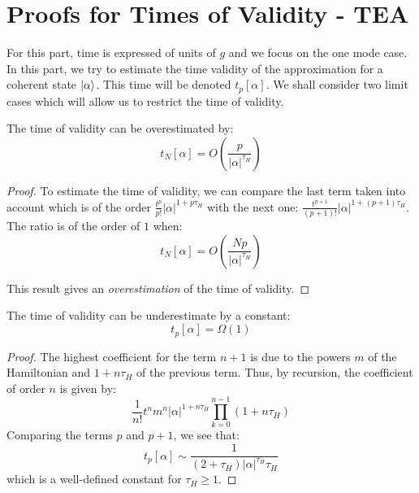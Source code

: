 \section{Proofs for Times of Validity - TEA} \label{proofs-time-val}
For this part, time is expressed of units of $g$ and we focus on the one mode case. In this part, we try to estimate the time validity of the approximation for a coherent state $\ket{\alpha}$. This time will be denoted $t_p[\alpha]$. We shall consider two limit cases which will allow us to restrict the time of validity.

\begin{theorem}
    The time of validity can be overestimated by:
    \begin{equation}
        t_N[\alpha] = O\left(\frac{p}{|\alpha|^{\tau_H}}\right)
    \end{equation}
\end{theorem}

\begin{proof}
    To estimate the time of validity, we can compare the last term taken into account which is of the order $\frac{t^p}{p!} |\alpha|^{1+ p \tau_H}$ with the next one: $\frac{t^{p+1}}{(p+1)!} |\alpha|^{1+ (p+1) \tau_H}$. The ratio is of the order of $1$ when:
    \begin{equation}
        t_N[\alpha] = O\left(\frac{Np}{|\alpha|^{\tau_H}}\right)
    \end{equation}

    This result gives an \textit{overestimation} of the time of validity.
\end{proof}

\begin{theorem}
    The time of validity can be underestimate by a constant:
    \begin{equation}
        t_p[\alpha] = \Omega(1)
    \end{equation}
\end{theorem}

\begin{proof}
    The highest coefficient for the term $n+1$ is due to the powers $m$ of the Hamiltonian and $1 + n \tau_H$ of the previous term. Thus, by recursion, the coefficient of order $n$ is given by:
    $$\frac{1}{n!} t^n m^n |\alpha|^{1+ n \tau_H} \prod_{k=0}^{n-1} (1 + n \tau_H)$$
    Comparing the terms $p$ and $p+1$, we see that:
    \begin{equation}
        t_p[\alpha] \sim \frac{1}{(2+\tau_H) |\alpha|^{\tau_H} \tau_H}
    \end{equation}
    which is a well-defined constant for $\tau_H \ge 1$.
\end{proof}